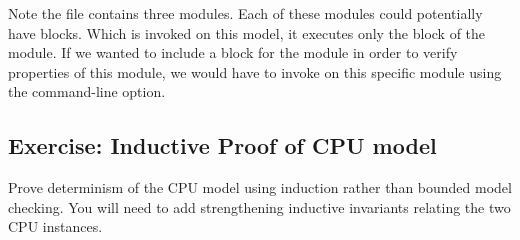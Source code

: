 Note the file  contains three modules. Each of these modules could potentially have  blocks. Which \uclid{} is invoked on this model, it executes only the  block of the  module.  If we wanted to include a  block for the  module in order to verify properties of this module, we would have to invoke \uclid{} on this specific module using the  command-line option.

\subsection{Exercise: Inductive Proof of CPU model}
Prove determinism of the CPU model using induction rather than bounded model checking. You will need to add strengthening inductive invariants relating the two CPU instances.
